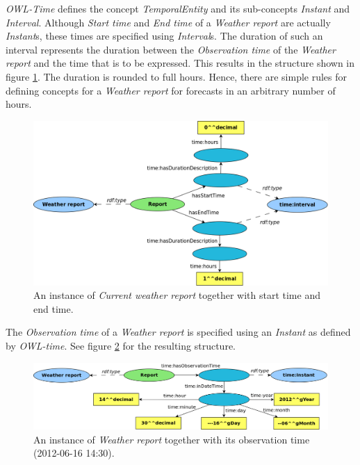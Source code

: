 \emph{OWL-Time} defines the concept \emph{TemporalEntity} and its sub-concepts \emph{Instant} and \emph{Interval}. Although \emph{Start time} and \emph{End time} of a \emph{Weather report} are actually \emph{Instant}s, these times are specified using \emph{Interval}s. The duration of such an interval represents the duration between the \emph{Observation time} of the \emph{Weather report} and the time that is to be expressed. This results in the structure shown in figure \ref{fig:owl_time1}. The duration is rounded to full hours. Hence, there are simple rules for defining concepts for a \emph{Weather report} for forecasts in an arbitrary number of hours.

\begin{figure}
  \includegraphics[width=\textwidth]{figures/diagrams/owl-time1.png}
  \caption{An instance of \emph{Current weather report} together with start time and end time.}
  \label{fig:owl_time1}
\end{figure}

The \emph{Observation time} of a \emph{Weather report} is specified using an \emph{Instant} as defined by \emph{OWL-time}. See figure \ref{fig:owl_time2} for the resulting structure.

\begin{figure}
  \includegraphics[width=\textwidth]{figures/diagrams/owl-time2.png}
  \caption{An instance of \emph{Weather report} together with its observation time (2012-06-16 14:30).}
  \label{fig:owl_time2}
\end{figure}

